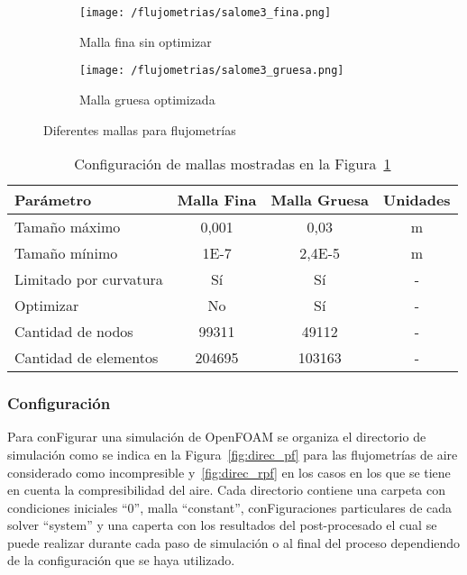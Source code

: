 \begin{figure}[t!]
    \centering
    \begin{subfigure}[t]{0.5\textwidth}
        \centering
        \texttt{[image: /flujometrias/salome3\_fina.png]}
        \caption{Malla fina sin optimizar}
    \end{subfigure}%
    \begin{subfigure}[t]{0.5\textwidth}
        \centering
        \texttt{[image: /flujometrias/salome3\_gruesa.png]}
        \caption{Malla gruesa optimizada}
    \end{subfigure}
    \caption{Diferentes mallas para flujometrías}\label{fig:salome_fina_gruesa}
\end{figure}

\begin{table}
    \centering
    \begin{tabular}{lccc} \toprule
        Parámetro                & Malla Fina    & Malla Gruesa     & Unidades\\ \midrule
        Tamaño máximo            & 0,001         & 0,03             & m \\
        Tamaño mínimo            & 1E-7          & 2,4E-5           & m \\
        Limitado por curvatura   & Sí            & Sí               & - \\
        Optimizar                & No            & Sí               & - \\
        Cantidad de nodos        & 99311         & 49112            & - \\
        Cantidad de elementos    & 204695        & 103163           & - \\ \bottomrule
    \end{tabular}
    \caption{Configuración de mallas mostradas en la Figura~\ref{fig:salome_fina_gruesa}}
    \label{tab:salome_fina_gruesa}
\end{table}


\subsubsection{Configuración}
%
Para conFigurar una simulación de OpenFOAM se organiza el directorio de
simulación como se indica en la Figura~\ref{fig:direc_pf} para las flujometrías
de aire considerado como incompresible  y~\ref{fig:direc_rpf} en los casos en
los que se tiene en cuenta la compresibilidad del aire.
%
Cada directorio contiene una carpeta con condiciones iniciales ``0'', malla
``constant'', conFiguraciones particulares de cada solver ``system'' y una
caperta con los resultados del post-procesado el cual se puede realizar
durante cada paso de simulación o al final del proceso dependiendo de la
configuración que se haya utilizado.

